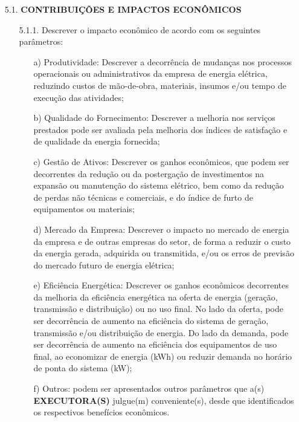 {\begin{lmarginbox}
\begin{enumerate}[leftmargin=1cm, font=\bfseries]
        \item[5.1.]	\textbf{CONTRIBUIÇÕES E IMPACTOS ECONÔMICOS}
            \begin{enumerate}[font=\bfseries]
                \item[5.1.1.] Descrever o impacto econômico de acordo com os seguintes parâmetros:
                    \begin{enumerate}[font=\bfseries]
                        \item[a)] Produtividade: Descrever a decorrência de mudanças nos processos operacionais ou administrativos da empresa de energia elétrica, reduzindo custos de mão-de-obra, materiais, insumos e/ou tempo de execução das atividades;
                        \item[b)] Qualidade do Fornecimento: Descrever a melhoria nos serviços prestados pode ser avaliada pela melhoria dos índices de satisfação e de qualidade da energia fornecida;
                        \item[c)] Gestão de Ativos: Descrever os ganhos econômicos, que podem ser decorrentes da redução ou da postergação de investimentos na expansão ou manutenção do sistema elétrico, bem como da redução de perdas não técnicas e comerciais, e do índice de furto de equipamentos ou materiais;
                        \item[d)] Mercado da Empresa: Descrever o impacto no mercado de energia da empresa e de outras empresas do setor, de forma a reduzir o custo da energia gerada, adquirida ou transmitida, e/ou os erros de previsão do mercado futuro de energia elétrica;
                        \item[e)] Eficiência Energética: Descrever os ganhos econômicos decorrentes da melhoria da eficiência energética na oferta de energia (geração, transmissão e distribuição) ou no uso final. No lado da oferta, pode ser decorrência de aumento na eficiência do sistema de geração, transmissão e/ou distribuição de energia. Do lado da demanda, pode ser decorrência de aumento na eficiência dos equipamentos de uso final, ao economizar de energia (kWh) ou reduzir demanda no horário de ponta do sistema (kW);
                        \item[f)] Outros: podem ser apresentados outros parâmetros que a(s) \textbf{EXECUTORA(S)} julgue(m) conveniente(s), desde que identificados os respectivos benefícios econômicos.
                    \end{enumerate}
            \end{enumerate}


\end{enumerate}
\end{lmarginbox}}

